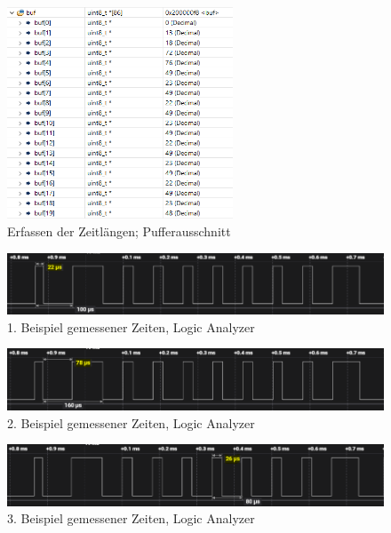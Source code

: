 \documentclass[11pt,a4paper,titlepage]{article}
\begin{document}
\begin{figure}[H]
    \centering
    \includegraphics[width=0.6\textwidth]{./Bilder-Tobit/Datenerfassung_pufferausschnitt.PNG}
    \caption{Erfassen der Zeitlängen; Pufferausschnitt}
    \label{fig:Puffer_1}
\end{figure}

\begin{figure}[H]
    \centering
    \includegraphics[width=\textwidth]{./Bilder-Tobit/Datenerfassung_LA_1.PNG}
    \caption{1. Beispiel gemessener Zeiten, Logic Analyzer}
    \label{fig:Puffer_LA_1}
\end{figure}

\begin{figure}[H]
    \centering
    \includegraphics[width=\textwidth]{./Bilder-Tobit/Datenerfassung_LA_2.PNG}
    \caption{2. Beispiel gemessener Zeiten, Logic Analyzer}
    \label{fig:Puffer_LA_2}
\end{figure}

\begin{figure}[H]
    \centering
    \includegraphics[width=\textwidth]{./Bilder-Tobit/Datenerfassung_LA_3.PNG}
    \caption{3. Beispiel gemessener Zeiten, Logic Analyzer}
    \label{fig:Puffer_LA_3}
\end{figure}
\end{document}
